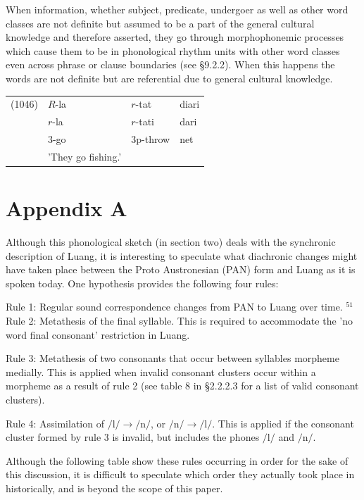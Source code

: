 \documentclass[10pt]{article}
\begin{document}
When information, whether subject, predicate, undergoer as well as other word classes are not definite but assumed to be a part of the general cultural knowledge and therefore asserted, they go through morphophonemic processes which cause them to be in phonological rhythm units with other word classes even across phrase or clause boundaries (see §9.2.2). When this happens the words are not definite but are referential due to general cultural knowledge.

\begin{center}
\begin{tabular}{llll}
(1046) & \(R\)-la & \(r\)-tat & diari \\
 & \(r\)-la & \(r\)-tati & dari \\
 & 3-go & 3p-throw & net \\
 & 'They go fishing.' &  &  \\
\end{tabular}
\end{center}

\section*{Appendix A}
Although this phonological sketch (in section two) deals with the synchronic description of Luang, it is interesting to speculate what diachronic changes might have taken place between the Proto Austronesian (PAN) form and Luang as it is spoken today. One hypothesis provides the following four rules:

Rule 1: Regular sound correspondence changes from PAN to Luang over time. \({ }^{51}\)\\
Rule 2: Metathesis of the final syllable. This is required to accommodate the 'no word final consonant' restriction in Luang.

Rule 3: Metathesis of two consonants that occur between syllables morpheme medially. This is applied when invalid consonant clusters occur within a morpheme as a result of rule 2 (see table 8 in §2.2.2.3 for a list of valid consonant clusters).

Rule 4: Assimilation of \(/ \mathrm{l} / \rightarrow / \mathrm{n} /\), or \(/ \mathrm{n} / \rightarrow / \mathrm{l} /\). This is applied if the consonant cluster formed by rule 3 is invalid, but includes the phones \(/ \mathrm{l} /\) and \(/ \mathrm{n} /\).

Although the following table show these rules occurring in order for the sake of this discussion, it is difficult to speculate which order they actually took place in historically, and is beyond the scope of this paper.
\end{document}

